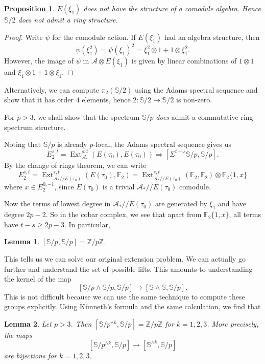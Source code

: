 \documentclass{shortart}
\newtheorem*{prop}{Proposition}
\newtheorem*{lemma}{Lemma}
\theoremstyle{definition}
\renewcommand\S{\mathbb{S}}
\newcommand\F{\mathbb{F}}
\newcommand\Z{\mathbb{Z}}
\newcommand\qq{/\!\!/}
\DeclareMathOperator\Ext{Ext}
\begin{document}
\begin{prop}
  $E(\xi_1)$ does not have the structure of a comodule algebra. Hence $\S/2$ does not admit a ring structure.
\end{prop}

\begin{proof}
  Write $\psi$ for the comodule action. If $E(\xi_1)$ had an algebra structure, then
  \[
    \psi(\xi_1^2) = \psi(\xi_1)^2 = \xi_1^2 \otimes 1 + 1 \otimes \xi_1^2.
  \]
  However, the image of $\psi$ in $\mathcal{A} \otimes E(\xi_1)$ is given by linear combinations of $1 \otimes 1$ and $\xi_1 \otimes 1 + 1 \otimes \xi_1$.
\end{proof}

Alternatively, we can compute $\pi_2(\S/2)$ using the Adams spectral sequence and show that it has order $4$ elements, hence $2: \S/2 \to \S/2$ is non-zero.

For $p > 3$, we shall show that the spectrum $\S/p$ \emph{does} admit a commutative ring spectrum structure.

Noting that $\S/p$ is already $p$-local, the Adams spectral sequence gives us
\[
  E_2^{s, t} = \Ext^{s, t}_{\mathcal{A}_*} (E(\tau_0), E(\tau_0)) \Rightarrow [\Sigma^{t - s} \S/p, \S/p].
\]
By the change of rings theorem, we can write
\[
  E_2^{s, t} = \Ext^{s, t}_{\mathcal{A}_*\qq E(\tau_0)} (E(\tau_0), \F_2) = \Ext^{s, t}_{\mathcal{A}_*\qq E(\tau_0)} (\F_2, \F_2) \otimes \F_2\{1, x\}
\]
where $x \in E_2^{0, -1}$, since $E(\tau_0)$ is a trivial $\mathcal{A}_*\qq E(\tau_0)$ comodule.

Now the terms of lowest degree in $\overline{\mathcal{A}_*\qq E(\tau_0)}$ are generated by $\xi_1$ and have degree $2p - 2$. So in the cobar complex, we see that apart from $\F_2\{1, x\}$, all terms have $t - s \geq 2p - 3$. In particular,
\begin{lemma}
  $[\S/p, \S/p] = \Z/p\Z$.\fakeqed
\end{lemma}
This tells us we can solve our original extension problem. We can actually go further and understand the set of possible lifts. This amounts to understanding the kernel of the map
\[
  [\S/p\wedge \S/p, \S/p] \to [\S \wedge \S, \S/p].
\]
This is not difficult because we can use the same technique to compute these groups explicitly. Using K\"unneth's formula and the same calculation, we find that
\begin{lemma}
  Let $p > 3$. Then $[\S/p^{\wedge k}, \S/p] = \Z/p\Z$ for $k = 1, 2, 3$. More precisely, the maps
  \[
    [\S/p^{\wedge k}, \S/p] \to [\S^{\wedge k}, \S/p]
  \]
  are bijections for $k = 1, 2, 3$.
\end{lemma}
\end{document}
